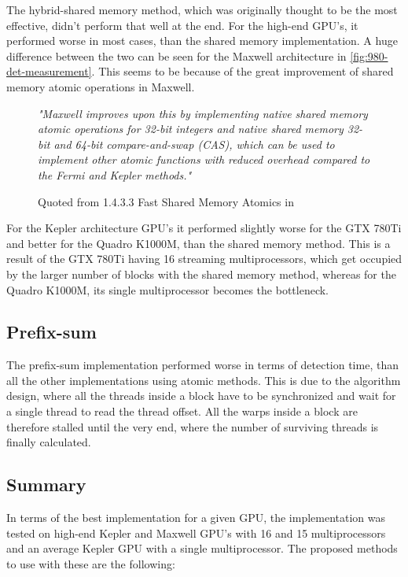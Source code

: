 The hybrid-shared memory method, which was originally thought to be the most effective, didn't perform that well at the end. For the high-end GPU's, it performed worse in most cases, than the shared memory implementation. A huge difference between the two can be seen for the Maxwell architecture in \ref{fig:980-det-measurement}. This seems to be because of the great improvement of shared memory atomic operations in Maxwell.

\begin{figure}
\textit{"Maxwell improves upon this by implementing native shared memory atomic operations for 32-bit integers and native shared memory 32-bit and 64-bit compare-and-swap (CAS), which can be used to implement other atomic functions with reduced overhead compared to the Fermi and Kepler methods."}
\caption{Quoted from 1.4.3.3 Fast Shared Memory Atomics in \cite{cuda-toolkit-docs}}
\end{figure}

For the Kepler architecture GPU's it performed slightly worse for the GTX 780Ti and better for the Quadro K1000M, than the shared memory method. This is a result of the GTX 780Ti having 16 streaming multiprocessors, which get occupied by the larger number of blocks with the shared memory method, whereas for the Quadro K1000M, its single multiprocessor becomes the bottleneck.

\subsection{Prefix-sum}

The prefix-sum implementation performed worse in terms of detection time, than all the other implementations using atomic methods. This is due to the algorithm design, where all the threads inside a block have to be synchronized and wait for a single thread to read the thread offset. All the warps inside a block are therefore stalled until the very end, where the number of surviving threads is finally calculated.

\subsection{Summary}

In terms of the best implementation for a given GPU, the implementation was tested on high-end Kepler and Maxwell GPU's with 16 and 15 multiprocessors and an average Kepler GPU with a single multiprocessor. The proposed methods to use with these are the following:

